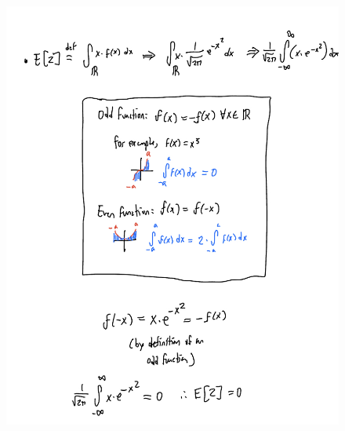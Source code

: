 \documentclass{article}
\begin{document}
\begin{figure}[!htb]
\begin{minipage}[b]{0.5\textwidth}
        \includegraphics[scale=0.25]{q1-2.jpeg}
    \end{minipage}
\end{figure}
\end{document}
